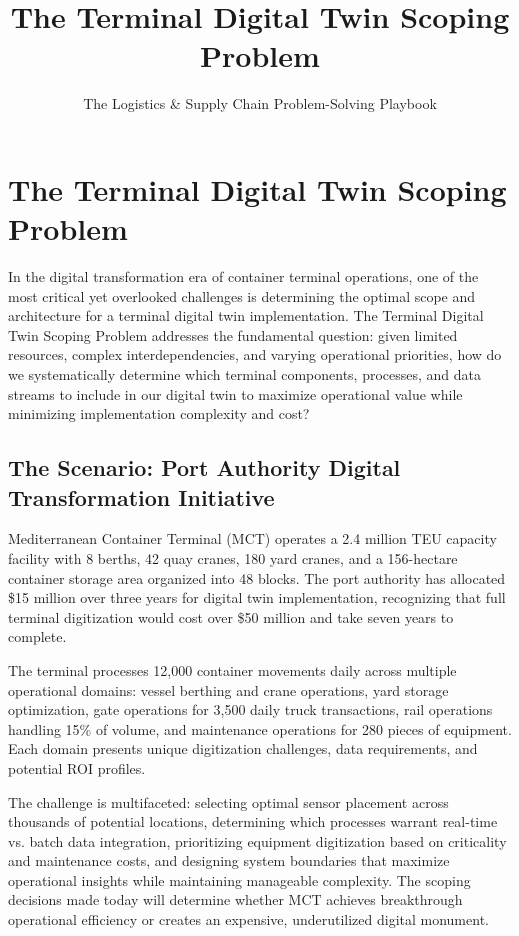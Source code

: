 \documentclass{article}
\title{The Terminal Digital Twin Scoping Problem}
\author{The Logistics \& Supply Chain Problem-Solving Playbook}
\date{}
\begin{document}
\maketitle

\section{The Terminal Digital Twin Scoping Problem}

In the digital transformation era of container terminal operations, one of the most critical yet overlooked challenges is determining the optimal scope and architecture for a terminal digital twin implementation. The Terminal Digital Twin Scoping Problem addresses the fundamental question: given limited resources, complex interdependencies, and varying operational priorities, how do we systematically determine which terminal components, processes, and data streams to include in our digital twin to maximize operational value while minimizing implementation complexity and cost?

\subsection{The Scenario: Port Authority Digital Transformation Initiative}

Mediterranean Container Terminal (MCT) operates a 2.4 million TEU capacity facility with 8 berths, 42 quay cranes, 180 yard cranes, and a 156-hectare container storage area organized into 48 blocks. The port authority has allocated \$15 million over three years for digital twin implementation, recognizing that full terminal digitization would cost over \$50 million and take seven years to complete.

The terminal processes 12,000 container movements daily across multiple operational domains: vessel berthing and crane operations, yard storage optimization, gate operations for 3,500 daily truck transactions, rail operations handling 15\% of volume, and maintenance operations for 280 pieces of equipment. Each domain presents unique digitization challenges, data requirements, and potential ROI profiles.

The challenge is multifaceted: selecting optimal sensor placement across thousands of potential locations, determining which processes warrant real-time vs. batch data integration, prioritizing equipment digitization based on criticality and maintenance costs, and designing system boundaries that maximize operational insights while maintaining manageable complexity. The scoping decisions made today will determine whether MCT achieves breakthrough operational efficiency or creates an expensive, underutilized digital monument.
\end{document}
